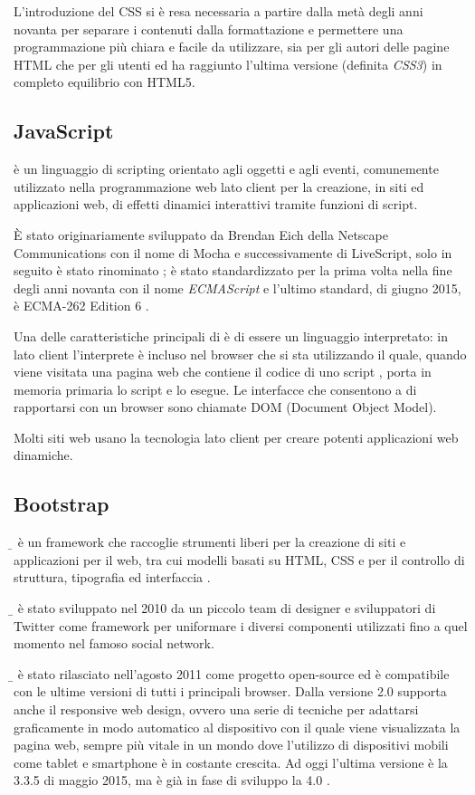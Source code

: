 L'introduzione del CSS si è resa necessaria a partire dalla metà degli anni novanta per separare i contenuti dalla formattazione e permettere una programmazione più chiara e facile da utilizzare, sia per gli autori delle pagine HTML che per gli utenti ed ha raggiunto l'ultima versione (definita \emph{CSS3}) in completo equilibrio con HTML5.

\subsection*{JavaScript}
\label{subs:js}
\emph{{\js}} è un linguaggio di scripting orientato agli oggetti e agli eventi, comunemente utilizzato nella programmazione web lato client per la creazione, in siti ed applicazioni web, di effetti dinamici interattivi tramite funzioni di script. 

È stato originariamente sviluppato da Brendan Eich della Netscape Communications con il nome di Mocha e successivamente di LiveScript, solo in seguito è stato rinominato {\js}; è stato standardizzato per la prima volta nella fine degli anni novanta con il nome \emph{ECMAScript} e l'ultimo standard, di giugno 2015, è ECMA-262 Edition 6 \cite{jsecma}.

Una delle caratteristiche principali di {\js} è di essere un linguaggio interpretato: in {\js} lato client l'interprete è incluso nel browser che si sta utilizzando il quale, quando viene visitata una pagina web che contiene il codice di uno script {\js}, porta in memoria primaria lo script e lo esegue. Le interfacce che consentono a {\js} di rapportarsi con un browser sono chiamate DOM (Document Object Model). 

Molti siti web usano la tecnologia {\js} lato client per creare potenti applicazioni web dinamiche.

\subsection*{Bootstrap}
\label{subs:bootstrap}
\emph{{\b}} è un framework che raccoglie strumenti liberi per la creazione di siti e applicazioni per il web, tra cui modelli basati su HTML, CSS e {\js} per il controllo di struttura, tipografia ed interfaccia \cite{bootstrap}.

{\b} è stato sviluppato nel 2010 da un piccolo team di designer e sviluppatori di Twitter come framework per uniformare i diversi componenti utilizzati fino a quel momento nel famoso social network.

{\b} è stato rilasciato nell'agosto 2011 come progetto open-source ed è compatibile con le ultime versioni di tutti i principali browser. Dalla versione 2.0 supporta anche il responsive web design, ovvero una serie di tecniche per adattarsi graficamente in modo automatico al dispositivo con il quale viene visualizzata la pagina web, sempre più vitale in un mondo dove l'utilizzo di dispositivi mobili come tablet e smartphone è in costante crescita. Ad oggi l'ultima versione è la 3.3.5 di maggio 2015, ma è già in fase di sviluppo la 4.0 \cite{bootstrap-github}.

